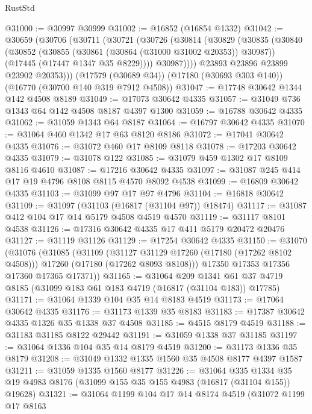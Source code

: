 \begin{lexlean}{RustStd}
\begin{coremodule}
@31000 := @30997 @30999
@31002 := @16852 (@16854 @1332)
@31042 := @30659
    (@30706
      (@30711
        (@30721
          (@30726
            (@30814
              (@30829
                (@30835
                  (@30840
                    (@30852
                      (@30855 (@30861 (@30864 (@31000 @31002 @20353)) @30987))
                      (@17445 (@17447 @1347 @35 @8229))))
                  @30987))))
          @23893
          @23896
          @23899
          @23902
          @20353)))
    (@17579 (@30689 @34))
    (@17180 (@30693 @303 @140))
    (@16770 (@30700 @140 @319 @7912 @4508))
@31047 := @17748 @30642 @1344 @142 @4508 @8189
@31049 := @17073 @30642 @4335
@31057 := @31049 @736 @1343 @64 @142 @4508 @8187 @4397 @1300
@31059 := @16788 @30642 @4335
@31062 := @31059 @1343 @64 @8187
@31064 := @16797 @30642 @4335
@31070 := @31064 @460 @1342 @17 @63 @8120 @8186
@31072 := @17041 @30642 @4335
@31076 := @31072 @460 @17 @8109 @8118
@31078 := @17203 @30642 @4335
@31079 := @31078 @122
@31085 := @31079 @459 @1302 @17 @8109 @8116 @4610
@31087 := @17216 @30642 @4335
@31097 := @31087 @245 @414 @17 @19 @4796 @8108 @8115 @4570 @8092 @4538
@31099 := @16809 @30642 @4335
@31103 := @31099 @97 @17 @97 @4796
@31104 := @16818 @30642
@31109 := @31097 (@31103 (@16817 (@31104 @97)) @18474)
@31117 := @31087 @412 @104 @17 @14 @5179 @4508 @4519 @4570
@31119 := @31117 @8101 @4538
@31126 := @17316 @30642 @4335 @17 @411 @5179 @20472 @20476
@31127 := @31119 @31126
@31129 := @17254 @30642 @4335
@31150 := @31070
    (@31076
      (@31085
        (@31109
          (@31127 @31129 @17260 (@17180 (@17262 @8102 @4508)))
          @17260
          (@17180 (@17262 @8093 @8108)))
        @17350
        @17353
        @17356
        @17360
        @17365
        @17371))
@31165 := @31064
    @209
    @1341
    @61
    @37
    @4719
    @8185
    (@31099 @183 @61 @183 @4719 (@16817 (@31104 @183)) @17785)
@31171 := @31064 @1339 @104 @35 @14 @8183 @4519
@31173 := @17064 @30642 @4335
@31176 := @31173 @1339 @35 @8183
@31183 := @17387 @30642 @4335 @1326 @35 @1338 @37 @4508
@31185 := @4515 @8179 @4519
@31188 := @31183 @31185 @8122 @29442
@31191 := @31059 @1338 @37 @31185
@31197 := @31064 @1336 @104 @35 @14 @8179 @4519
@31200 := @31173 @1336 @35 @8179
@31208 := @31049 @1332 @1335 @1560 @35 @4508 @8177 @4397 @1587
@31211 := @31059 @1335 @1560 @8177
@31226 := @31064
    @335
    @1334
    @35
    @19
    @4983
    @8176
    (@31099 @155 @35 @155 @4983 (@16817 (@31104 @155)) @19628)
@31321 := @31064
    @1199
    @104
    @17
    @14
    @8174
    @4519
    (@31072
      @1199
      @17
      @8163

\end{coremodule}
\end{lexlean}
